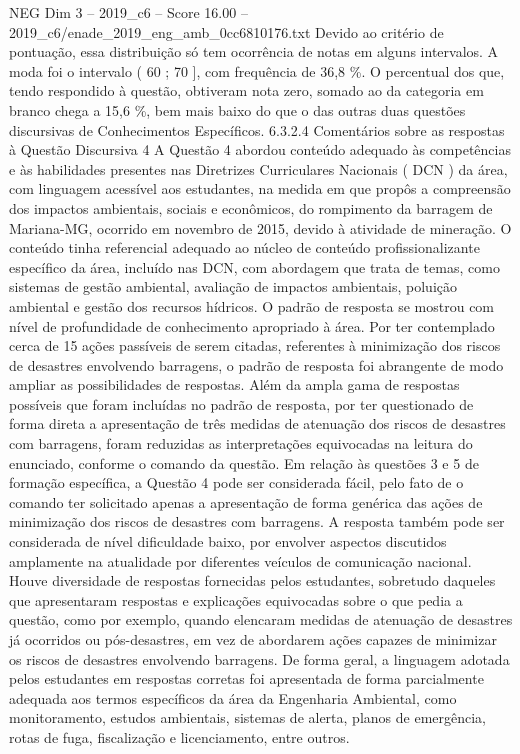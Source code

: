 \begin{textsample}{NEG Dim 3 – 2019\_c6 – Score 16.00 – 2019\_c6/enade\_2019\_eng\_amb\_0cc6810176.txt}
Devido ao critério de pontuação, essa distribuição só tem ocorrência de notas em alguns intervalos.
A moda foi o intervalo ( 60 ; 70 ], com frequência de 36,8 \%.
O percentual dos que, tendo respondido à questão, obtiveram nota zero, somado ao da categoria em branco chega a 15,6 \%, bem mais baixo do que o das outras duas questões discursivas de Conhecimentos Específicos. 6.3.2.4 Comentários sobre as respostas à Questão Discursiva 4 A Questão 4 abordou conteúdo adequado às competências e às habilidades presentes nas Diretrizes Curriculares Nacionais ( DCN ) da área, com linguagem acessível aos estudantes, na medida em que propôs a compreensão dos impactos ambientais, sociais e econômicos, do rompimento da barragem de Mariana-MG, ocorrido em novembro de 2015, devido à atividade de mineração.
O conteúdo tinha referencial adequado ao núcleo de conteúdo profissionalizante específico da área, incluído nas DCN, com abordagem que trata de temas, como sistemas de gestão ambiental, avaliação de impactos ambientais, poluição ambiental e gestão dos recursos hídricos.
O padrão de resposta se mostrou com nível de profundidade de conhecimento apropriado à área.
Por ter contemplado cerca de 15 ações passíveis de serem citadas, referentes à minimização dos riscos de desastres envolvendo barragens, o padrão de resposta foi abrangente de modo ampliar as possibilidades de respostas.
Além da ampla gama de respostas possíveis que foram incluídas no padrão de resposta, por ter questionado de forma direta a apresentação de três medidas de atenuação dos riscos de desastres com barragens, foram reduzidas as interpretações equivocadas na leitura do enunciado, conforme o comando da questão.
Em relação às questões 3 e 5 de formação específica, a Questão 4 pode ser considerada fácil, pelo fato de o comando ter solicitado apenas a apresentação de forma genérica das ações de minimização dos riscos de desastres com barragens.
A resposta também pode ser considerada de nível dificuldade baixo, por envolver aspectos discutidos amplamente na atualidade por diferentes veículos de comunicação nacional.
Houve diversidade de respostas fornecidas pelos estudantes, sobretudo daqueles que apresentaram respostas e explicações equivocadas sobre o que pedia a questão, como por exemplo, quando elencaram medidas de atenuação de desastres já ocorridos ou pós-desastres, em vez de abordarem ações capazes de minimizar os riscos de desastres envolvendo barragens.
De forma geral, a linguagem adotada pelos estudantes em respostas corretas foi apresentada de forma parcialmente adequada aos termos específicos da área da Engenharia Ambiental, como monitoramento, estudos ambientais, sistemas de alerta, planos de emergência, rotas de fuga, fiscalização e licenciamento, entre outros.

\end{textsample}
